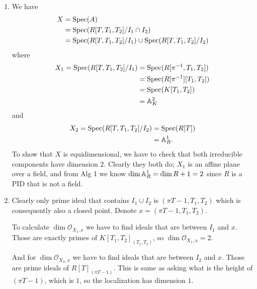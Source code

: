 \begin{exercise}{3}
    \begin{enumerate}
        \item
            We have
            \begin{equation*}
                \begin{split}
                    X &= \operatorname{Spec}(A) \\
                    &= \operatorname{Spec}(R[T, T_1, T_2] / I_1 \cap I_2) \\
                    &= \operatorname{Spec}(R[T, T_1, T_2] / I_1) \cup \operatorname{Spec}(R[T, T_1, T_2] / I_2)
                \end{split}
            \end{equation*}
            where
            \begin{equation*}
                \begin{split}
                    X_1 = \operatorname{Spec}(R[T, T_1, T_2] / I_1) &= \operatorname{Spec}(R[\pi^{-1}, T_1, T_2]) \\
                    &= \operatorname{Spec}(R[\pi^{-1}][T_1, T_2]) \\
                    &= \operatorname{Spec}(K[T_1, T_2]) \\
                    &= \mathbb{A}^2_K
                \end{split}
            \end{equation*}
            and
            \begin{equation*}
                \begin{split}
                    X_2 = \operatorname{Spec}(R[T, T_1, T_2] / I_2) &= \operatorname{Spec}(R[T]) \\
                    &= \mathbb{A}^1_R.
                \end{split}
            \end{equation*}
            To show that $X$ is equidimensional, we have to check that both irreducible
            components have dimension $2$.
            Clearly they both do;
            $X_1$ is an affine plane over a field, and from Alg 1 we know $\dim \mathbb{A}^1_R
            = \dim R + 1 = 2$ since $R$ is a PID that is not a field.
        \item
            Clearly only prime ideal that contains $I_1 \cup I_2$ is $(\pi T - 1, T_1,
            T_2)$ which is consequently also a closed point.
            Denote $x = (\pi T - 1, T_1, T_2)$.

            To calculate $\dim \mathcal{O}_{X_1, x}$ we have to find ideals that
            are between $I_1$ and $x$. Those are exactly primes of
            $K[T_1, T_2]_{(T_1, T_2)}$, so $\dim \mathcal{O}_{X_1, x} = 2$.

            And for $\dim \mathcal{O}_{X_2, x}$ we have to find ideals that are
            between $I_2$ and $x$. Those are prime ideals of $R[T]_{(\pi T -
            1)}$. This is same as asking what is the height of $(\pi T - 1)$,
            which is $1$, so the localization has dimension $1$.
    \end{enumerate}
\end{exercise}




